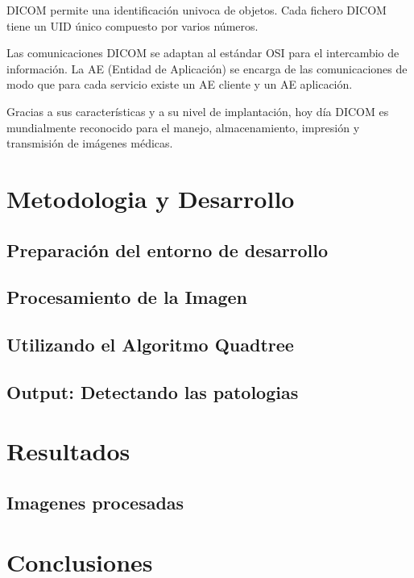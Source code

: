 \documentclass{article}
\begin{document}
DICOM permite una identificación univoca de objetos. Cada fichero DICOM tiene un UID único compuesto por varios números.

Las comunicaciones DICOM se adaptan al estándar OSI para el intercambio de información. La AE (Entidad de Aplicación) se encarga de las comunicaciones de modo que para cada servicio existe un AE cliente y un AE aplicación.

Gracias a sus características y a su nivel de implantación, hoy día DICOM es mundialmente reconocido para el manejo, almacenamiento, impresión y transmisión de imágenes médicas.


\section{Metodologia y Desarrollo}

\subsection{Preparación del entorno de desarrollo}
\subsection{Procesamiento de la Imagen}
\subsection{Utilizando el Algoritmo Quadtree}
\subsection{Output: Detectando las patologias}




\section{Resultados}
\subsection{Imagenes procesadas}



\section{Conclusiones}


	
	
	
\end{document}
